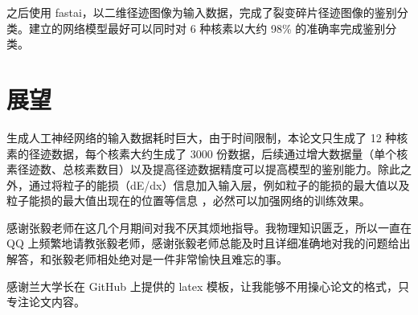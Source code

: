 \documentclass[AutoFakeBold]{LZUThesis}
\begin{document}
之后使用 fastai，以二维径迹图像为输入数据，完成了裂变碎片径迹图像的鉴别分类。建立的网络模型最好可以同时对 6 种核素以大约 98\% 的准确率完成鉴别分类。



\section{展望}
生成人工神经网络的输入数据耗时巨大，由于时间限制，本论文只生成了 12 种核素的径迹数据，每个核素大约生成了 3000 份数据，后续通过增大数据量（单个核素径迹数、总核素数目）以及提高径迹数据精度可以提高模型的鉴别能力。除此之外，通过将粒子的能损（dE/dx）信息加入输入层，例如粒子的能损的最大值以及粒子能损的最大值出现在的位置等信息 \cite{闫洋洋2018用于高精度裂变截面测量的时间投影室}，必然可以加强网络的训练效果。


\backmatter


\printbib



\Thanks
感谢张毅老师在这几个月期间对我不厌其烦地指导。我物理知识匮乏，所以一直在 QQ 上频繁地请教张毅老师，感谢张毅老师总能及时且详细准确地对我的问题给出解答，和张毅老师相处绝对是一件非常愉快且难忘的事。

感谢兰大学长在 GitHub 上提供的 latex 模板，让我能够不用操心论文的格式，只专注论文内容。
\end{document}
